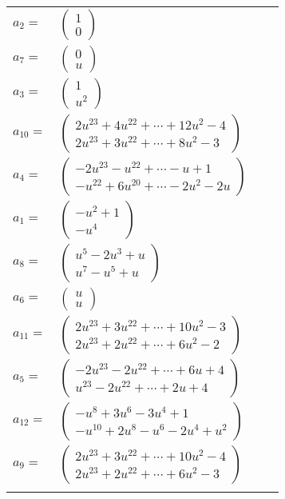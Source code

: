 \documentclass[1p]{elsarticle_modified}
\theoremstyle{definition}
\begin{document}
\begin{tabular}{m{7pt} m{180pt} m{7pt} m{180pt} }
\flushright $a_{2}=$&$\begin{pmatrix}1\\0\end{pmatrix}$ \\
\flushright $a_{7}=$&$\begin{pmatrix}0\\u\end{pmatrix}$ \\
\flushright $a_{3}=$&$\begin{pmatrix}1\\u^2\end{pmatrix}$ \\
\flushright $a_{10}=$&$\begin{pmatrix}2 u^{23}+4 u^{22}+\cdots+12 u^2-4\\2 u^{23}+3 u^{22}+\cdots+8 u^2-3\end{pmatrix}$ \\
\flushright $a_{4}=$&$\begin{pmatrix}-2 u^{23}- u^{22}+\cdots- u+1\\- u^{22}+6 u^{20}+\cdots-2 u^2-2 u\end{pmatrix}$ \\
\flushright $a_{1}=$&$\begin{pmatrix}- u^2+1\\- u^4\end{pmatrix}$ \\
\flushright $a_{8}=$&$\begin{pmatrix}u^5-2 u^3+u\\u^7- u^5+u\end{pmatrix}$ \\
\flushright $a_{6}=$&$\begin{pmatrix}u\\u\end{pmatrix}$ \\
\flushright $a_{11}=$&$\begin{pmatrix}2 u^{23}+3 u^{22}+\cdots+10 u^2-3\\2 u^{23}+2 u^{22}+\cdots+6 u^2-2\end{pmatrix}$ \\
\flushright $a_{5}=$&$\begin{pmatrix}-2 u^{23}-2 u^{22}+\cdots+6 u+4\\u^{23}-2 u^{22}+\cdots+2 u+4\end{pmatrix}$ \\
\flushright $a_{12}=$&$\begin{pmatrix}- u^8+3 u^6-3 u^4+1\\- u^{10}+2 u^8- u^6-2 u^4+u^2\end{pmatrix}$ \\
\flushright $a_{9}=$&$\begin{pmatrix}2 u^{23}+3 u^{22}+\cdots+10 u^2-4\\2 u^{23}+2 u^{22}+\cdots+6 u^2-3\end{pmatrix}$\\&\end{tabular}
\end{document}
